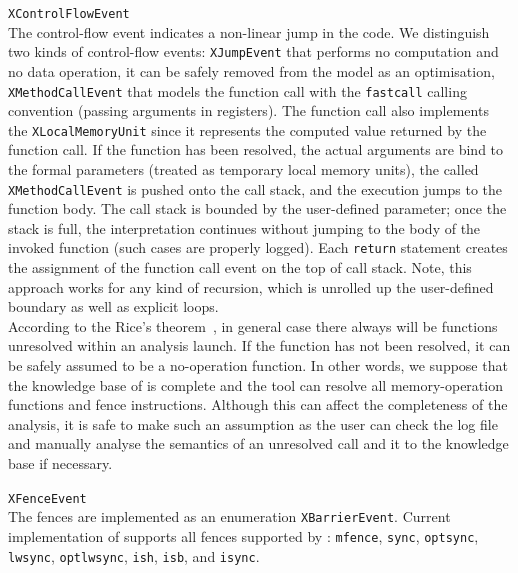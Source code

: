 \begin{outline}
  \1 \texttt{XControlFlowEvent} \\
    The control-flow event indicates a non-linear jump in the code. We distinguish two kinds of control-flow events: 
    \2 \texttt{XJumpEvent} that performs no computation and no data operation, it can be safely removed from the model as an optimisation,
    \2 \texttt{XMethodCallEvent} that models the function call with the \texttt{fastcall} calling convention (passing arguments in registers).
    The function call also implements the \texttt{XLocalMemoryUnit} since it represents the computed value returned by the function call.
    If the function has been resolved, the actual arguments are bind to the formal parameters (treated as temporary local memory units), the called \texttt{XMethodCallEvent} is pushed onto the call stack, and the execution jumps to the function body.
    The call stack is bounded by the user-defined parameter; once the stack is full, the interpretation continues without jumping to the body of the invoked function (such cases are properly logged). %
    Each \texttt{return} statement creates the assignment of the function call event on the top of call stack.
    Note, this approach works for any kind of recursion, which is unrolled up the user-defined boundary as well as explicit loops.
    \\
    According to the Rice's theorem~\cite{rice1953classes}, in general case there always will be functions unresolved within an analysis launch.
    If the function has not been resolved, it can be safely assumed to be a no-operation function.
    In other words, we suppose that the knowledge base of \porthos[2] is complete and the tool can resolve all memory-operation functions and fence instructions.
    Although this can affect the completeness of the analysis, it is safe to make such an assumption as the user can check the log file and manually analyse the semantics of an unresolved call and it to the knowledge base if necessary.

  \1 \texttt{XFenceEvent} \\
    The fences are implemented as an enumeration \texttt{XBarrierEvent}.
    Current implementation of \porthos[2] supports all fences supported by \porthos{}: 
    \texttt{mfence}, %
    \texttt{sync}, \texttt{optsync}, \texttt{lwsync}, \texttt{optlwsync}, \texttt{ish}, \texttt{isb}, and \texttt{isync}.%
    

\end{outline}
